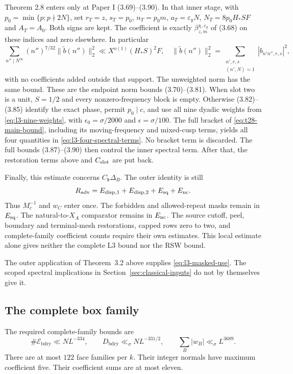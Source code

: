 Theorem 2.8 enters only at Paper I (3.69)--(3.90). In that inner stage,
with $p_0=\min\{p:p\nmid2N\}$, set
$r_T=z$, $s_T=p_0$, $n_T=p_0m$, $a_T=\varepsilon_yN$,
$N_T=8p_0H_*SF$ and $A_T=A_0$. Both signs are kept. The coefficient
is exactly $\beta_{z,m}^{\chi,\varepsilon_y}$ of (3.68) on these
indices and zero elsewhere. In particular
\[
 \sum_{n''\mid N^\infty}(n'')^{7/32}
       \|\widetilde b(n'')\|_2^2
 \ll X^{o(1)}(H_*S)^2F,\quad
 \|\widetilde b(n'')\|_2^2
 =\sum_{\substack{n',r,s\\(n',N)=1}}|b_{n'n'',r,s}|^2,
\]
with no coefficients added outside that support. The unweighted norm
has the same bound. These are the endpoint norm bounds (3.70)--(3.81).
When slot two is a unit, $S=1/2$ and every nonzero-frequency block is
empty. Otherwise (3.82)--(3.85) identify the exact phase, permit
$p_0\mid c$, and use all nine dyadic weights from
\eqref{eq:l3-nine-weights}, with $\epsilon_0=\sigma/2000$ and
$\epsilon=\sigma/100$. The full bracket of
\eqref{eq:t28-main-bound}, including its moving-frequency and mixed-cusp
terms, yields all four quantities in \eqref{eq:l3-four-spectral-terms}.
No bracket term is discarded. The full bounds (3.87)--(3.90) then
control the inner spectral term. After that, the restoration terms
above and $C_{\rm slot}$ are put back.

Finally, this estimate concerns $C_{\mathfrak b}\Delta_B$.
The outer identity is still
\[
 R_{\rm adv}=E_{\rm disp,1}+E_{\rm disp,2}
             +E_{\rm sq}+E_{\rm nc}.
\]
Thus $M_c^{-1}$ and $w_C$ enter once. The forbidden and allowed-repeat
masks remain in $E_{\rm sq}$. The natural-to-$X_A$ comparator remains
in $E_{\rm nc}$. The source cutoff, peel, boundary and terminal-mesh
restorations, capped rows zero to two, and complete-family coefficient
counts require their own estimates. This local estimate alone
gives neither the complete L3 bound nor the RSW bound.

The outer application of Theorem~3.2 above supplies \eqref{eq:l3-masked-use}.
The scoped spectral implications in Section~\ref{sec:classical-inputs}
do not by themselves give it.

\subsection{The complete box family}

The required complete-family bounds are
\begin{equation}\label{eq:l3-boundary}
 \#\mathcal E_{\mathrm{bdry}}\ll NL^{-334},\qquad
 D_{\mathrm{bdry}}\ll_\sigma NL^{-331/2},\qquad
 \sum_B|w_B|\ll_\sigma L^{3689}.
\end{equation}
There are at most $122$ face families per $k$.
Their integer normals have maximum coefficient five.
Their coefficient sums are at most eleven.
